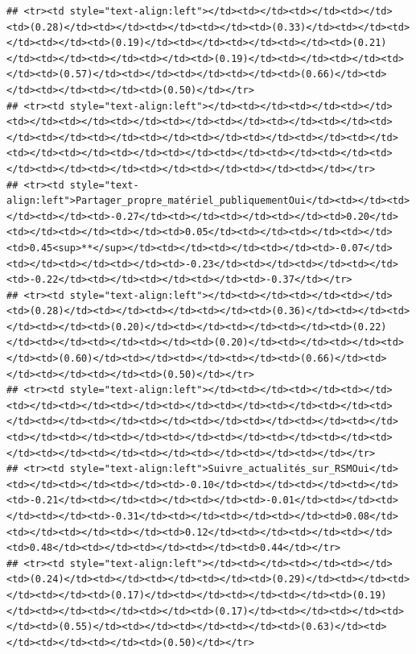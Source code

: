 \documentclass[
]{article}
\begin{document}
\begin{verbatim}
## <tr><td style="text-align:left"></td><td></td><td></td><td></td><td>(0.28)</td><td></td><td></td><td></td><td>(0.33)</td><td></td><td></td><td></td><td>(0.19)</td><td></td><td></td><td></td><td>(0.21)</td><td></td><td></td><td></td><td>(0.19)</td><td></td><td></td><td></td><td>(0.57)</td><td></td><td></td><td></td><td>(0.66)</td><td></td><td></td><td></td><td>(0.50)</td></tr>
## <tr><td style="text-align:left"></td><td></td><td></td><td></td><td></td><td></td><td></td><td></td><td></td><td></td><td></td><td></td><td></td><td></td><td></td><td></td><td></td><td></td><td></td><td></td><td></td><td></td><td></td><td></td><td></td><td></td><td></td><td></td><td></td><td></td><td></td><td></td><td></td></tr>
## <tr><td style="text-align:left">Partager_propre_matériel_publiquementOui</td><td></td><td></td><td></td><td>-0.27</td><td></td><td></td><td></td><td>0.20</td><td></td><td></td><td></td><td>0.05</td><td></td><td></td><td></td><td>0.45<sup>**</sup></td><td></td><td></td><td></td><td>-0.07</td><td></td><td></td><td></td><td>-0.23</td><td></td><td></td><td></td><td>-0.22</td><td></td><td></td><td></td><td>-0.37</td></tr>
## <tr><td style="text-align:left"></td><td></td><td></td><td></td><td>(0.28)</td><td></td><td></td><td></td><td>(0.36)</td><td></td><td></td><td></td><td>(0.20)</td><td></td><td></td><td></td><td>(0.22)</td><td></td><td></td><td></td><td>(0.20)</td><td></td><td></td><td></td><td>(0.60)</td><td></td><td></td><td></td><td>(0.66)</td><td></td><td></td><td></td><td>(0.50)</td></tr>
## <tr><td style="text-align:left"></td><td></td><td></td><td></td><td></td><td></td><td></td><td></td><td></td><td></td><td></td><td></td><td></td><td></td><td></td><td></td><td></td><td></td><td></td><td></td><td></td><td></td><td></td><td></td><td></td><td></td><td></td><td></td><td></td><td></td><td></td><td></td><td></td></tr>
## <tr><td style="text-align:left">Suivre_actualités_sur_RSMOui</td><td></td><td></td><td></td><td>-0.10</td><td></td><td></td><td></td><td>-0.21</td><td></td><td></td><td></td><td>-0.01</td><td></td><td></td><td></td><td>-0.31</td><td></td><td></td><td></td><td>0.08</td><td></td><td></td><td></td><td>0.12</td><td></td><td></td><td></td><td>0.48</td><td></td><td></td><td></td><td>0.44</td></tr>
## <tr><td style="text-align:left"></td><td></td><td></td><td></td><td>(0.24)</td><td></td><td></td><td></td><td>(0.29)</td><td></td><td></td><td></td><td>(0.17)</td><td></td><td></td><td></td><td>(0.19)</td><td></td><td></td><td></td><td>(0.17)</td><td></td><td></td><td></td><td>(0.55)</td><td></td><td></td><td></td><td>(0.63)</td><td></td><td></td><td></td><td>(0.50)</td></tr>

\end{verbatim}
\end{document}
